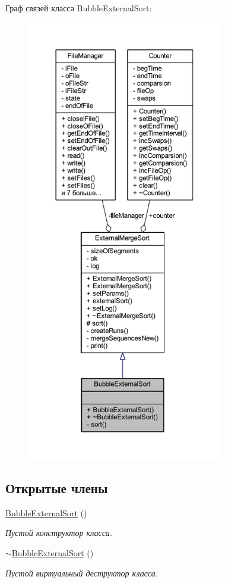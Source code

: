 Граф связей класса Bubble\+External\+Sort\+:\nopagebreak
\begin{figure}[H]
\begin{center}
\leavevmode
\includegraphics[height=550pt]{class_bubble_external_sort__coll__graph}
\end{center}
\end{figure}
\subsection*{Открытые члены}
\begin{DoxyCompactItemize}
\item 
\hyperlink{class_bubble_external_sort_a420f93ff7677a75557f805749011f86e}{Bubble\+External\+Sort} ()
\begin{DoxyCompactList}\small\item\em Пустой конструктор класса. \end{DoxyCompactList}\item 
\hyperlink{class_bubble_external_sort_a2075c6e2117da937f397ceb993336e81}{$\sim$\+Bubble\+External\+Sort} ()
\begin{DoxyCompactList}\small\item\em Пустой виртуальный деструктор класса. \end{DoxyCompactList}\end{DoxyCompactItemize}
